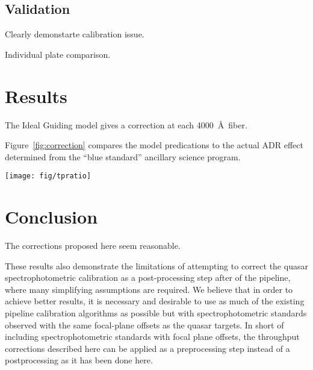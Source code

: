 \documentclass[preprint2]{aastex}
\providecommand{\fig}[1]{Figure~\ref{fig:#1}}
\begin{document}
\subsection{Validation}

Clearly demonstarte calibration issue. 

Individual plate comparison.

\section{Results}

The Ideal Guiding model gives a correction at each 4000~\AA~fiber. 

\fig{correction} compares the model predications to the actual ADR effect determined from the ``blue standard'' ancillary science program.

\begin{figure*}
\centering
\texttt{[image: fig/tpratio]}
\caption{The corrections for all $\lambda_{eff}$ = 4000~\AA~targets on a plate using the mean observing hour angle and mean PSF size. The transparent lines correspond to correction curves for individual targets while the thick opaque lines correspond the coadded spectrum ratios of the standard and alternate reductions for ancillary targets on this plate. The blue and red colors indicate fibers 1-500 and 501-1000 respectively.}
\label{fig:correction}
\end{figure*}

\section{Conclusion}

The corrections proposed here seem reasonable.

These results also demonstrate the limitations of attempting to correct the quasar spectrophotometric calibration as a post-processing step after of the pipeline, where many simplifying assumptions are required. We believe that in order to achieve better results, it is necessary and desirable to use as much of the existing pipeline calibration algorithms as possible but with spectrophotometric standards observed with the same focal-plane offsets as the quasar targets. In short of including spectrophotometric standards with focal plane offsets, the throughput corrections described here can be applied as a preprocessing step instead of a postprocessing as it has been done here.


\end{document}
